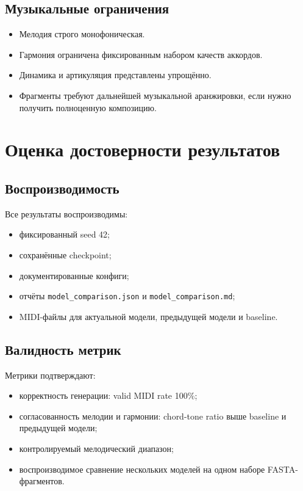 \subsection{Музыкальные ограничения}

\begin{itemize}
\item Мелодия строго монофоническая.
\item Гармония ограничена фиксированным набором качеств аккордов.
\item Динамика и артикуляция представлены упрощённо.
\item Фрагменты требуют дальнейшей музыкальной аранжировки, если нужно получить полноценную композицию.
\end{itemize}

\section{Оценка достоверности результатов}

\subsection{Воспроизводимость}

Все результаты воспроизводимы:
\begin{itemize}
\item фиксированный seed 42;
\item сохранённые checkpoint;
\item документированные конфиги;
\item отчёты \texttt{model\_comparison.json} и \texttt{model\_comparison.md};
\item MIDI-файлы для актуальной модели, предыдущей модели и baseline.
\end{itemize}

\subsection{Валидность метрик}

Метрики подтверждают:
\begin{itemize}
\item корректность генерации: valid MIDI rate 100\%;
\item согласованность мелодии и гармонии: chord-tone ratio выше baseline и предыдущей модели;
\item контролируемый мелодический диапазон;
\item воспроизводимое сравнение нескольких моделей на одном наборе FASTA-фрагментов.
\end{itemize}

